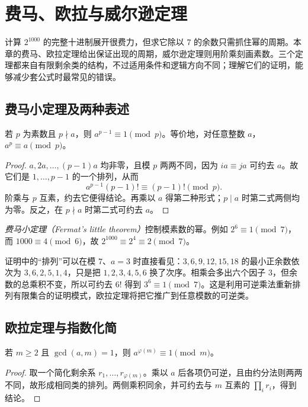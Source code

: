 \setcounter{chapter}{6} %
\chapter{费马、欧拉与威尔逊定理}
\label{ch:classical-congruences}

计算 $2^{1000}$ 的完整十进制展开很费力，但求它除以 $7$ 的余数只需抓住幂的周期。本章的费马、欧拉定理给出保证出现的周期，威尔逊定理则用阶乘刻画素数。三个定理都来自有限剩余类的结构，不过适用条件和逻辑方向不同；理解它们的证明，能够减少套公式时最常见的错误。

\section{费马小定理及两种表述}

\begin{theorem}[费马小定理]
\label{thm:fermat}
若 $p$ 为素数且 $p\nmid a$，则 $a^{p-1}\equiv1\pmod p$。等价地，对任意整数 $a$，$a^p\equiv a\pmod p$。
\end{theorem}
\begin{proof}
$a,2a,\ldots,(p-1)a$ 均非零，且模 $p$ 两两不同，因为 $ia\equiv ja$ 可约去 $a$。故它们是 $1,\ldots,p-1$ 的一个排列，从而
\[
 a^{p-1}(p-1)!\equiv(p-1)!\pmod p.
\]
阶乘与 $p$ 互素，约去它便得结论。再乘以 $a$ 得第二种形式；$p\mid a$ 时第二式两侧均为零。反之，在 $p\nmid a$ 时第二式可约去 $a$。
\end{proof}

\emph{费马小定理（Fermat's little theorem）}控制模素数的幂。例如 $2^6\equiv1\pmod7$，而 $1000\equiv4\pmod6$，故 $2^{1000}\equiv2^4\equiv2\pmod7$。

证明中的“排列”可以在模 $7$、$a=3$ 时直接看见：$3,6,9,12,15,18$ 的最小正余数依次为 $3,6,2,5,1,4$，只是把 $1,2,3,4,5,6$ 换了次序。相乘会多出六个因子 $3$，但余数的总乘积不变，所以可约去 $6!$ 得到 $3^6\equiv1\pmod7$。这是利用可逆乘法重新排列有限集合的证明模式，欧拉定理将把它推广到任意模数的可逆类。

\section{欧拉定理与指数化简}

\begin{theorem}[欧拉定理]
\label{thm:euler}
若 $m\ge2$ 且 $\gcd(a,m)=1$，则 $a^{\varphi(m)}\equiv1\pmod m$。
\end{theorem}
\begin{proof}
取一个简化剩余系 $r_1,\ldots,r_{\varphi(m)}$。乘以 $a$ 后各项仍可逆，且由约分法则两两不同，故形成相同类的排列。两侧乘积同余，并可约去与 $m$ 互素的 $\prod_i r_i$，得到结论。
\end{proof}


